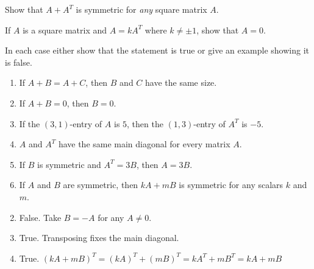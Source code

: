 \begin{multicols}{2}
\begin{ex}
\begin{sol}
\begin{enumerate}[label={\alph*.}]
\end{enumerate}
\end{sol}
\end{ex}

\begin{ex}
Show that $A + A^{T}$ is symmetric for \textit{any} square matrix $A$.
\end{ex}

\begin{ex}
If $A$ is a square matrix and $A = kA^{T}$ where $k \neq \pm 1$, show that $A = 0$.
\end{ex}

\begin{ex}
In each case either show that the statement is true or give an example showing it is false.


\begin{enumerate}[label={\alph*.}]
\item If $A + B = A + C$, then $B$ and $C$ have the same size.

\item If $A + B = 0$, then $B = 0$.

\item If the $(3, 1)$-entry of $A$ is $5$, then the $(1, 3)$-entry of $A^{T}$ is $-5$.

\item $A$ and $A^{T}$ have the same main diagonal for every matrix $A$.

\item If $B$ is symmetric and $A^{T} = 3B$, then $A = 3B$.

\item If $A$ and $B$ are symmetric, then $kA + mB$ is symmetric for any scalars $k$ and $m$.

\end{enumerate}
\begin{sol}
\begin{enumerate}[label={\alph*.}]
\setcounter{enumi}{1}
\item  False. Take $B = -A$ for any $A \neq 0$.

\setcounter{enumi}{3}
\item True. Transposing fixes the main diagonal. 

\setcounter{enumi}{5}
\item True. $(kA + mB)^{T} = (kA)^{T} + (mB)^{T} = kA^{T} + mB^{T} = kA + mB$

\end{enumerate}
\end{sol}
\end{ex}


\end{multicols}
